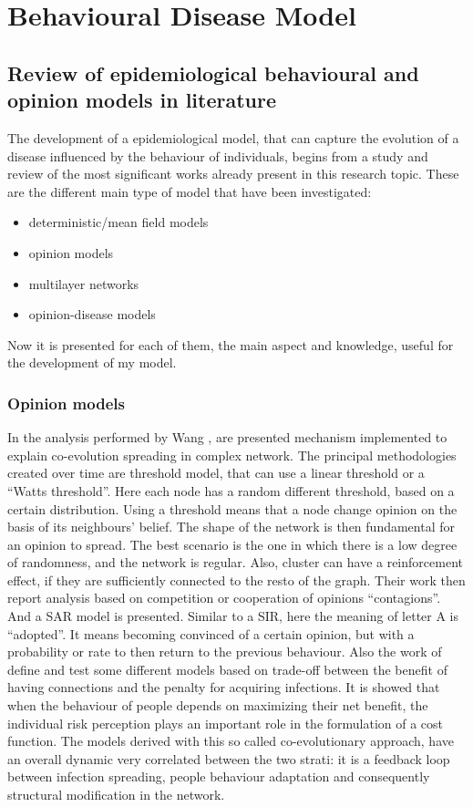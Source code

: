 \part{Behavioural Disease Model}

\chapter{Review of epidemiological behavioural and opinion models in literature}

The development of a epidemiological model, that can capture the evolution of a disease influenced by the behaviour of individuals, begins from a study and review of the most significant works already present in this research topic.
These are the different main type of model that have been investigated:
\begin{itemize}
	\item deterministic/mean field models
	\item opinion models
	\item multilayer networks
	\item opinion-disease models	
\end{itemize}

Now it is presented for each of them, the main aspect and knowledge, useful for the development of my model.   

\section{Opinion models}
In the analysis performed by Wang \cite{Wang_2019}, are presented mechanism implemented to explain co-evolution spreading in complex network. The principal methodologies created over time are threshold model, that can use a linear threshold or a “Watts threshold”. Here each node has a random different threshold, based on a certain distribution. Using a threshold means that a node change opinion on the basis of its neighbours’ belief. The shape of the network is then fundamental for an opinion to spread. The best scenario is the one in which there is a low degree of randomness, and the network is regular. Also, cluster can have a reinforcement effect, if they are sufficiently connected to the resto of the graph. Their work then report analysis based on competition or cooperation of opinions “contagions”. And a SAR model is presented. Similar to a SIR, here the meaning of letter A is “adopted”. It means becoming convinced of a certain opinion, but with a probability or rate to then return to the previous behaviour. Also the work of \cite{Nunner2021} define and test some different models based on trade-off between the benefit of having connections and the penalty for acquiring infections. It is showed that when the behaviour of people depends on maximizing their net benefit, the individual risk perception plays an important role in the formulation of a cost function. The models derived with this so called co-evolutionary approach, have an overall dynamic very correlated between the two strati: it is a feedback loop between infection spreading, people behaviour adaptation and consequently structural modification in the network.


